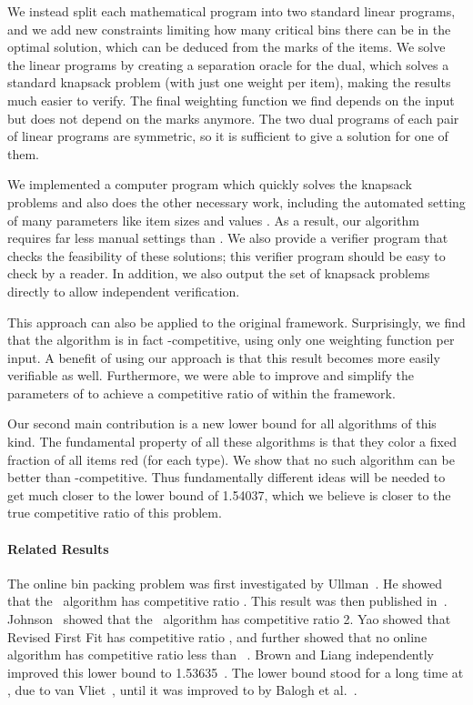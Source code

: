 We instead split each mathematical program into two standard linear programs, and we add new constraints limiting how many critical bins there can be in the optimal solution, which can be deduced from the marks of the items. We solve the linear programs by creating a separation oracle for the dual, which solves a standard knapsack problem (with just one weight per item), making the results much easier to verify. The final weighting function we find depends on the input but does not depend on the marks anymore.
The two dual programs of each pair of linear programs are symmetric, so it is sufficient to give a solution for one of them.


We implemented a computer program which quickly solves the knapsack problems and also does the other necessary work, including the automated setting of many parameters like item sizes and values . As a result, our algorithm  {\SonofH} requires far less manual settings than \Hpp. We also provide a verifier program that checks the feasibility of these solutions; this verifier program should be easy to check by a reader. In addition, we also output the set of knapsack problems directly to allow independent verification.

This approach can also be applied to the original {\SuperH} framework. Surprisingly, we find that the algorithm {\Hpp} is in fact \superhratio-competitive,
using only one weighting function per input. 
A benefit of using our approach is that this result becomes more easily verifiable as well. 
Furthermore, we were able to improve and simplify the parameters of {\Hpp} to achieve a competitive ratio of {\newsuperhratio} within the {\SuperH} framework.

Our second main contribution is a new lower bound for all algorithms of this kind.
The fundamental property of all these algorithms is that they color a fixed fraction
of all items red (for each type). 
We show that no such algorithm can be better
than {\finallb}-competitive. Thus fundamentally different ideas will be needed to
get much closer to the lower bound of 1.54037, which we believe is closer to the
true competitive ratio of this problem.


\paragraph{Related Results}
The online bin packing problem was first investigated by
Ullman~\cite{Ullman71}.
He showed that the \ff\ algorithm has competitive ratio
. This result was then published in~\cite{GaGrUl72}.
Johnson~\cite{Johnso74} showed that the \nf\ algorithm has competitive ratio 2.
Yao showed that {\sc Revised First Fit} has competitive ratio ,
and further showed that no online algorithm has competitive ratio less
than ~\cite{Yao80A}.
Brown and Liang independently improved this lower bound to
1.53635~\cite{Brown79,Liang80}.
The lower bound stood for a long time at ,
due to van Vliet~\cite{Vliet92},
until it was improved to  by Balogh et al.~\cite{BBG12}.

